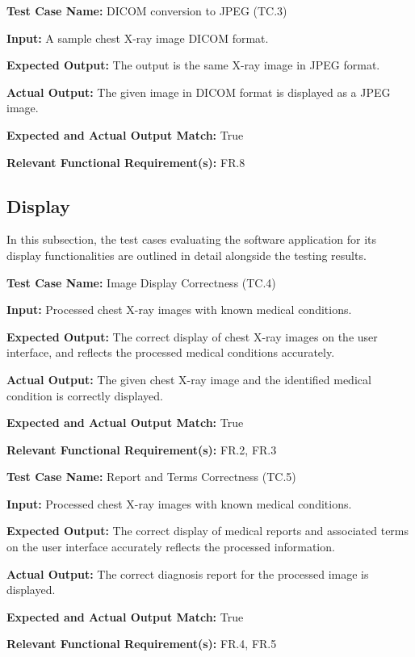 \documentclass[12pt, titlepage]{article}
\begin{document}
\begin{mdframed}[linewidth=0.5mm]
  \textbf{Test Case Name:} DICOM conversion to JPEG (TC.3) \par
  \textbf{Input:} A sample chest X-ray image DICOM format. \par
  \textbf{Expected Output:} The output is the same X-ray image in JPEG format. \par
  \textbf{Actual Output:} The given image in DICOM format is displayed as a JPEG image. \par
  \textbf{Expected and Actual Output Match:} True \par
  \textbf{Relevant Functional Requirement(s):} FR.8
\end{mdframed}

\subsection{Display}
In this subsection, the test cases evaluating the software application for its display functionalities are outlined in detail alongside the testing results. \\

\begin{mdframed}[linewidth=0.5mm]
  \textbf{Test Case Name:} Image Display Correctness (TC.4) \par
  \textbf{Input:} Processed chest X-ray images with known medical conditions. \par
  \textbf{Expected Output:} The correct display of chest X-ray images on the user interface, and reflects the processed medical conditions accurately. \par
  \textbf{Actual Output:} The given chest X-ray image and the identified medical condition is correctly displayed. \par
  \textbf{Expected and Actual Output Match:} True \par
  \textbf{Relevant Functional Requirement(s):} FR.2, FR.3
\end{mdframed}

\begin{mdframed}[linewidth=0.5mm]
  \textbf{Test Case Name:} Report and Terms Correctness (TC.5) \par
  \textbf{Input:} Processed chest X-ray images with known medical conditions. \par
  \textbf{Expected Output:} The correct display of medical reports and associated terms on the user interface accurately reflects the processed information. \par
  \textbf{Actual Output:} The correct diagnosis report for the processed image is displayed. \par
  \textbf{Expected and Actual Output Match:} True \par
  \textbf{Relevant Functional Requirement(s):} FR.4, FR.5
\end{mdframed}
\end{document}
